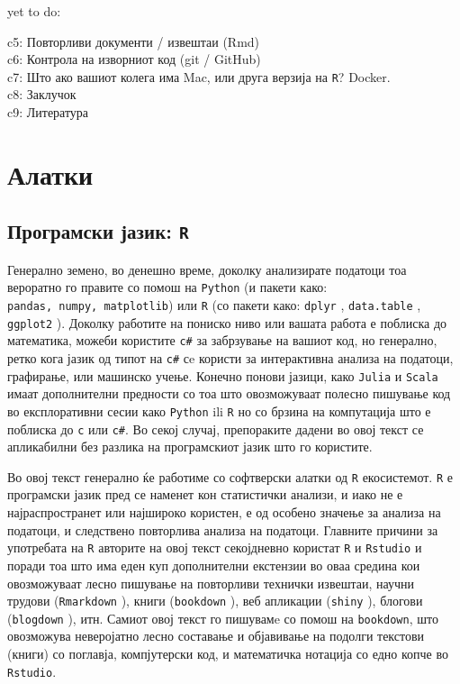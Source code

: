 \documentclass[
]{book}
\begin{document}
yet to do:

c5: Повторливи документи / извештаи (Rmd)\\
c6: Контрола на изворниот код (git / GitHub)\\
c7: Што ако вашиот колега има Mac, или друга верзија на \texttt{R}? Docker.\\
c8: Заклучок\\
c9: Литература

\hypertarget{tools}{%
\chapter{Алатки}\label{tools}}

\hypertarget{ux43fux440ux43eux433ux440ux430ux43cux441ux43aux438-ux458ux430ux437ux438ux43a-r}{%
\section{\texorpdfstring{Програмски јазик: \texttt{R}}{Програмски јазик: R}}\label{ux43fux440ux43eux433ux440ux430ux43cux441ux43aux438-ux458ux430ux437ux438ux43a-r}}

Генерално земено, во денешно време, доколку анализирате податоци тоа вероратно го правите со помош на \texttt{Python} (и пакети како: \texttt{pandas,\ numpy,\ matplotlib}) или \texttt{R} (со пакети како: \texttt{dplyr} \citep{R-dplyr}, \texttt{data.table} \citep{R-data.table}, \texttt{ggplot2} \citep{R-ggplot2}). Доколку работите на пониско ниво или вашата работа е поблиска до математика, можеби користите \texttt{c\#} за забрзување на вашиот код, но генерално, ретко кога јазик од типот на \texttt{c\#} сe користи за интерактивна анализа на податоци, графирање, или машинско учење. Конечно понови јазици, како \texttt{Julia} и \texttt{Scala} имаат дополнителни предности со тоа што овозможуваат полесно пишување код во експлоративни сесии како \texttt{Python} ili \texttt{R} но со брзина на компутација што е поблиска до \texttt{c} или \texttt{c\#}. Во секој случај, препораките дадени во овој текст се апликабилни без разлика на програмскиот јазик што го користите.

Во овој текст генерално ќе работиме со софтверски алатки од \texttt{R} екосистемот. \texttt{R} е програмски јазик пред се наменет кон статистички анализи, и иако не е најраспространет или најшироко користен, е од особено значење за анализа на податоци, и следствено повторлива анализа на податоци. Главните причини за употребата на \texttt{R} авторите на овој текст секојдневно користат \texttt{R} и \texttt{Rstudio} и поради тоа што има еден куп дополнителни екстензии во оваа средина кои овозможуваат лесно пишување на повторливи технички извештаи, научни трудови (\texttt{Rmarkdown} \citep{R-rmarkdown}), книги (\texttt{bookdown} \citep{R-bookdown}), веб апликации (\texttt{shiny} \citep{R-shiny}), блогови (\texttt{blogdown} \citep{R-blogdown}), итн. Самиот овој текст го пишувамe со помош на \texttt{bookdown}, што овозможува неверојатно лесно составање и објавивање на подолги текстови (книги) со поглавја, компјутерски код, и математичка нотација со едно копче во \texttt{Rstudio}.
\end{document}
